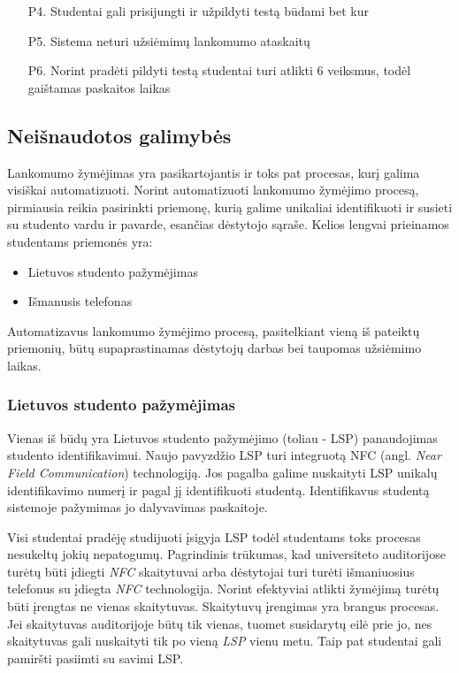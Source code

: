 \documentclass{VUMIFPSbakalaurinis}
\begin{document}
\begin{itemize}
    \item[P4.] Studentai gali prisijungti ir užpildyti testą būdami bet kur
    \item[P5.] Sistema neturi užsiėmimų lankomumo ataskaitų
    \item[P6.] Norint pradėti pildyti testą studentai turi atlikti 6 veiksmus, todėl gaištamas paskaitos laikas
\end{itemize}

\subsection{Neišnaudotos galimybės}

Lankomumo žymėjimas yra pasikartojantis ir toks pat procesas, kurį galima visiškai automatizuoti. Norint automatizuoti lankomumo žymėjimo procesą, pirmiausia reikia pasirinkti priemonę, kurią galime unikaliai identifikuoti ir susieti su studento vardu ir pavarde, esančias dėstytojo sąraše. Kelios lengvai prieinamos studentams priemonės yra:

\begin{itemize}
	\item Lietuvos studento pažymėjimas
	\item Išmanusis telefonas
\end{itemize}

Automatizavus lankomumo žymėjimo procesą, pasitelkiant vieną iš pateiktų priemonių, būtų supaprastinamas dėstytojų darbas bei taupomas užsiėmimo laikas. 

\subsubsection{Lietuvos studento pažymėjimas}
Vienas iš būdų yra Lietuvos studento pažymėjimo (toliau - LSP) panaudojimas studento identifikavimui. Naujo pavyzdžio LSP turi integruotą NFC (angl. \textit{Near Field Communication}) technologiją.  Jos pagalba galime nuskaityti LSP unikalų identifikavimo numerį ir pagal jį identifikuoti studentą. Identifikavus studentą sistemoje pažymimas jo dalyvavimas paskaitoje.

Visi studentai pradėję studijuoti įsigyja LSP todėl studentams toks procesas nesukeltų jokių nepatogumų. Pagrindinis trūkumas, kad universiteto auditorijose turėtų būti įdiegti \textit{NFC} skaitytuvai arba dėstytojai turi turėti išmaniuosius telefonus su įdiegta \textit{NFC} technologija. Norint efektyviai atlikti žymėjimą turėtų būti įrengtas ne vienas skaitytuvas. Skaitytuvų įrengimas yra brangus procesas. Jei skaitytuvas auditorijoje būtų tik vienas, tuomet susidarytų eilė prie jo, nes skaitytuvas gali nuskaityti tik po vieną \textit{LSP} vienu metu. Taip pat studentai gali pamiršti pasiimti su savimi LSP.
\end{document}
